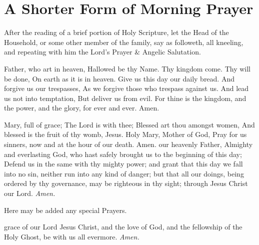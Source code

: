 \section*{A Shorter Form of Morning Prayer}
\begin{rubric}
    After the reading of a brief portion of Holy Scripture, let the Head of the Household, or some other member of the family, say as followeth, all kneeling, and repeating with him the Lord's Prayer \& Angelic Salutation.
\end{rubric}
 Father, who art in heaven, Hallowed be thy Name. Thy kingdom come. Thy will be done, On earth as it is in heaven. Give us this day our daily bread. And forgive us our trespasses, As we forgive those who trespass against us. And lead us not into temptation, But deliver us from evil. For thine is the kingdom, and the power, and the glory, for ever and ever. Amen.\par
{}
 Mary, full of grace; The Lord is with thee; Blessed art thou amongst women, And blessed is the fruit of thy womb, Jesus. Holy Mary, Mother of God, Pray for us sinners, now and at the hour of our death. Amen.
 our heavenly Father, Almighty and everlasting God, who hast safely brought us to the beginning of this day; Defend us in the same with thy mighty power; and grant that this day we fall into no sin, neither run into any kind of danger; but that all our doings, being ordered by thy governance, may be righteous in thy sight; through Jesus Christ our Lord. \textit{Amen.}
\begin{rubric}
    Here may be added any special Prayers.
\end{rubric}
 grace of our Lord Jesus Christ, {} and the love of God, and the fellowship of the Holy Ghost, be with us all evermore. \textit{Amen.}
 
